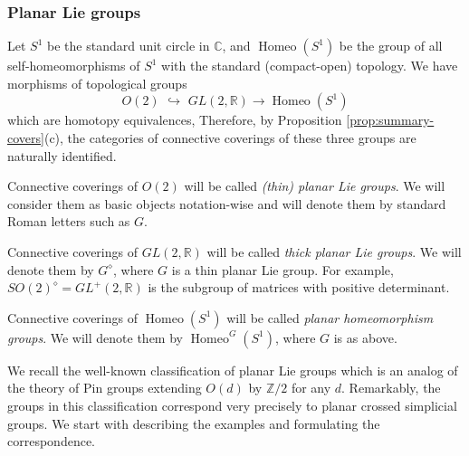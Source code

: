 \documentclass[english,11pt,leqno]{article}
\def\CC{\mathbb{C}}
\def\RR{\mathbb{R}}
\def\ZZ{\mathbb{Z}}
\def\on{\operatorname}
\def\lra{\longrightarrow}
\def\Homeo{{ \on{Homeo}}}
\theoremstyle{definition}
\theoremstyle{remark}
\numberwithin{equation}{section}
\begin{document}
 \subsubsection{Planar Lie groups}\label{subsub:plan-lie}
 
 Let $S^1$ be the standard unit circle in $\CC$, and  $\Homeo(S^1)$ be the group of all self-homeomorphisms
 of $S^1$ with the standard (compact-open) topology.
 We have morphisms of topological groups
 \[
 O(2) \,\,\hookrightarrow \,\, GL(2,\RR) \lra \Homeo(S^1)
 \]
 which are homotopy equivalences, Therefore, by Proposition \ref{prop:summary-covers}(c), the categories
 of connective coverings of these three groups are naturally identified. 
 
 Connective coverings of $O(2)$ will be called {\em (thin) planar Lie groups}. We will consider
 them as basic objects notation-wise and will denote them by standard Roman letters such as $G$.
 
 Connective coverings of $GL(2, \RR)$ will be called {\em thick planar Lie groups}. We will
 denote them by $G^\diamond$, where $G$ is a thin planar Lie group. For example,
 $SO(2)^\diamond = GL^+(2,\RR)$ is the subgroup of matrices with positive determinant. 
 
 Connective coverings of $\Homeo(S^1)$ will be called {\em planar homeomorphism groups}.
 We will denote them by $\Homeo^G(S^1)$, where $G$ is as above. 
 
 
  
  
We recall the well-known classification of planar Lie groups which is an analog of the theory of
Pin groups  \cite{ABS} extending $O(d)$ by $\ZZ/2$ for any $d$. Remarkably, the groups in this
classification correspond very precisely to planar crossed simplicial groups.  We start with
describing the examples and formulating the correspondence. 
    
\end{document}

